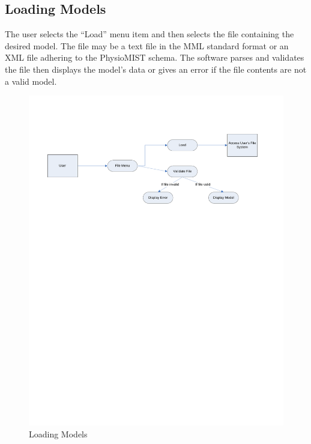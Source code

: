 \documentclass{article}
\begin{document}
\subsection{Loading Models}
The user selects the ``Load'' menu item and then selects the file containing the desired model. The file may be a text file in the MML standard format or an XML file adhering to the PhysioMIST schema. The software parses and validates the file then displays the model's data or gives an error if the file contents are not a valid model.
\begin{figure}[!htb]
\centering
\includegraphics[width=\textwidth]{./diagrams/load}
\caption{Loading Models}
\end{figure}
\end{document}
